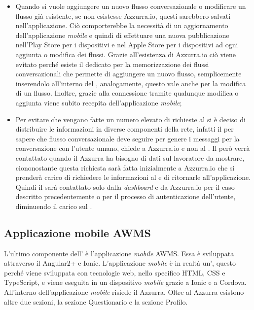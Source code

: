 \begin{trivlist}
	\begin{itemize}
		\item Quando si vuole aggiungere un nuovo flusso conversazionale o modificare un flusso già esistente, se non esistesse Azzurra.io, questi sarebbero salvati nell'applicazione. Ciò comporterebbe la necessità di un aggiornamento dell'applicazione \emph{mobile} e quindi di effettuare una nuova pubblicazione nell'Play Store per i dispositivi  e nel Apple Store per i dispositivi  ad ogni aggiunta o modifica dei flussi. Grazie all'esistenza di Azzurra.io ciò viene evitato perché esiste il  dedicato per la memorizzazione dei flussi conversazionali che permette di aggiungere un nuovo flusso, semplicemente inserendolo all'interno del , analogamente, questo vale anche per la modifica di un flusso. Inoltre, grazie alla connessione tramite  qualunque modifica o aggiunta viene subito recepita dell'applicazione \emph{mobile};
		\item Per evitare che vengano fatte un numero elevato di richieste al  si è deciso di distribuire le informazioni in diverse componenti della rete, infatti il  per sapere che flusso conversazionale deve seguire per genere i messaggi per la conversazione con l'utente umano, chiede a Azzurra.io e non al . Il  però verrà contattato quando il  Azzurra ha bisogno di dati sul lavoratore da mostrare, ciononostante questa richiesta sarà fatta inizialmente a Azzurra.io che si prenderà carico di richiedere le informazioni al  e di ritornarle all'applicazione. Quindi il  sarà contattato solo dalla \emph{dashboard} e da Azzurra.io per il caso descritto precedentemente o per il processo di autenticazione dell'utente, diminuendo il carico sul .
	\end{itemize}
	
	\item\subsection{Applicazione mobile AWMS}
	L'ultimo componente dell' è l'applicazione \emph{mobile} \gls{AWMS}. Essa è sviluppata attraverso il  Angular2+ e Ionic. L'applicazione \emph{mobile} è in realtà un', questo perché viene sviluppata con tecnologie web, nello specifico \gls{HTML}, \gls{CSS} e TypeScript, e viene eseguita in un dispositivo \emph{mobile} grazie a Ionic e a Cordova. All'interno dell'applicazione \emph{mobile} risiede il  Azzurra. Oltre al  Azzurra esistono altre due sezioni, la sezione Questionario e la sezione Profilo. 
	

\end{trivlist}
